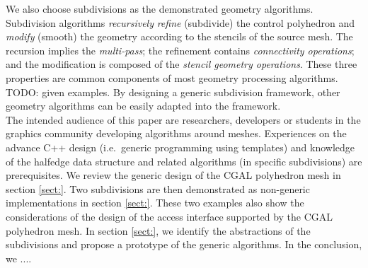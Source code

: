 We also choose subdivisions as the demonstrated geometry algorithms.
Subdivision algorithms \emph{recursively} \emph{refine} (subdivide)
the control polyhedron and \emph{modify} (smooth) the geometry
according to the stencils of the source mesh. The recursion implies
the \emph{multi-pass}; the refinement contains \emph{connectivity
operations}; and the modification is composed of the \emph{stencil
geometry operations}.  These three properties are common components of
most geometry processing algorithms. TODO: given examples.  By
designing a generic subdivision framework, other geometry algorithms
can be easily adapted into the framework.\\

The intended audience of this paper are researchers, developers or
students in the graphics community developing algorithms around
meshes. Experiences on the advance C++ design (i.e.\ generic
programming using templates) and knowledge of the halfedge data
structure and related algorithms (in specific subdivisions) are
prerequisites.  We review the generic design of the CGAL polyhedron
mesh in section \ref{sect:}. Two subdivisions are then demonstrated as
non-generic implementations in section \ref{sect:}.  These two
examples also show the considerations of the design of the access
interface supported by the CGAL polyhedron mesh. In section
\ref{sect:}, we identify the abstractions of the subdivisions and
propose a prototype of the generic algorithms. In the conclusion, we
....







